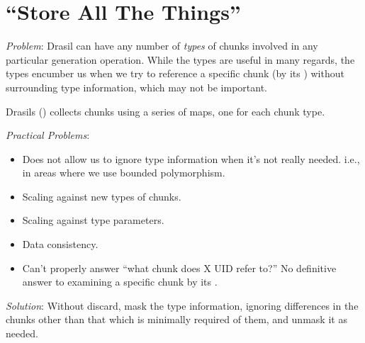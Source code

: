 \chapter{\textquotedblleft{}Store All The Things\textquotedblright{}}
\label{chap:storingChunks}

\begin{writingdirectives}

      \item \textit{Problem}: Drasil can have any number of \textit{types} of
            chunks involved in any particular generation operation. While the
            types are useful in many regards, the types encumber us when we try
            to reference a specific chunk (by its \UID{}) without surrounding
            type information, which may not be important.

      \item Drasils \ChunkDB{} () collects chunks
            using a series of maps, one for each chunk type.

      \item \textit{Practical Problems}:
            \begin{itemize}

                  \item Does not allow us to ignore type information when it's
                        not really needed. i.e., in areas where we use bounded
                        polymorphism.

                  \item Scaling against new types of chunks.
                  
                  \item Scaling against type parameters.
                  
                  \item Data consistency.
                  
                  \item Can't properly answer ``what chunk does X UID refer
                        to?'' No definitive answer to examining a specific chunk
                        by its \UID{}.

            \end{itemize}

      \item \textit{Solution}: Without discard, mask the type information,
            ignoring differences in the chunks other than that which is
            minimally required of them, and unmask it as needed.


\end{writingdirectives}
